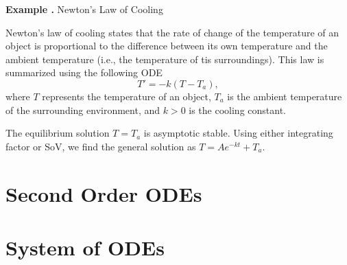 \documentclass[12pt, a4paper]{article}
\newcounter{index}[subsection]
\newenvironment*{eg}{\begin{framed}\par\noindent\textbf{Example \thesubsection.\stepcounter{index}\theindex}}{\par\end{framed}}
\begin{document}
\begin{eg}
	Newton's Law of Cooling\par 
	Newton's law of cooling states that the rate of change of the temperature of an object is proportional to the difference between its own temperature and the ambient temperature (i.e., the temperature of tis surroundings). This law is summarized using the following ODE \[T'=-k(T-T_a),\] where $T$ represents the temperature of an object, $T_a$ is the ambient temperature of the surrounding environment, and $k>0$ is the cooling constant. \par The equilibrium solution $T=T_a$ is asymptotic stable. Using either integrating factor or SoV, we find the general solution as $T=Ae^{-kt}+T_a.$
\end{eg}

\newpage
\section{Second Order ODEs}

\newpage
\section{System of ODEs}
\end{document}

